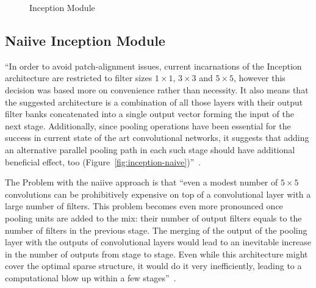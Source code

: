 \documentclass[11pt]{article}
\begin{document}
\begin{figure}[H]
    \centering
    \caption{Inception Module}
\end{figure}

\subsection{Naiive Inception Module}

``In order to avoid patch-alignment issues, current incarnations of the Inception architecture are restricted to filter sizes $ 1\times1$, $ 3\times3$ and $ 5\times5$, however this decision was based more on convenience rather than necessity. It also means that the suggested architecture is a combination of all those layers with their output filter banks concatenated into a single output vector forming the input of the next stage. Additionally, since pooling operations have been essential for the success in current state of the art convolutional networks, it suggests that adding an alternative parallel pooling path in each such stage should have additional beneficial effect, too (Figure~\ref{fig:inception-naive})''~\cite{Inception}.

The Problem with the naiive approach is that ``even a modest number of $ 5\times5$ convolutions can be prohibitively expensive on top of a convolutional layer with a large number of filters. This problem becomes even more pronounced once pooling units are added to the mix: their number of output filters equals to the number of filters in the previous stage. The merging of the output of the pooling layer with the outputs of convolutional layers would lead to an inevitable increase in the number of outputs from stage to stage. Even while this architecture might cover the optimal sparse structure, it would do it very inefficiently, leading to a computational blow up within a few stages''~\cite{Inception}.
\end{document}
